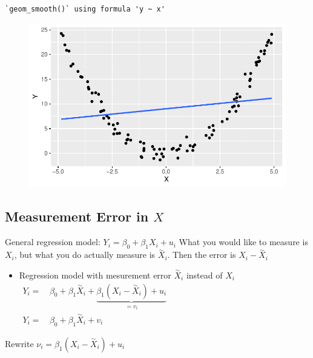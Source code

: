 \documentclass[
  letterpaper,
  DIV=11,
  numbers=noendperiod]{scrartcl}
\providecommand{\tightlist}{%
  \setlength{\itemsep}{0pt}\setlength{\parskip}{0pt}}\usepackage{longtable,booktabs,array}
\begin{document}
\begin{verbatim}
`geom_smooth()` using formula 'y ~ x'
\end{verbatim}

\begin{figure}[H]

{\centering \includegraphics{assesing_regression_files/figure-pdf/unnamed-chunk-4-1.pdf}

}

\end{figure}

\hypertarget{measurement-error-in-x}{%
\subsection{\texorpdfstring{Measurement Error in
\(X\)}{Measurement Error in X}}\label{measurement-error-in-x}}

General regression model: \(Y_i = \beta_0 + \beta_1X_{i} + u_{i}\) What
you would like to measure is \(X_i\), but what you do actually measure
is \(\overset{\sim}{X}_i\). Then the error is
\(X_i - \overset{\sim}{X}_i\)

\begin{itemize}
\tightlist
\item
  Regression model with mesurement error \(\overset{\sim}{X}_i\) instead
  of \(X_i\)
  \(\begin{align*} Y_i =& \, \beta_0 + \beta_1 \overset{\sim}{X}_i + \underbrace{\beta_1 (X_i - \overset{\sim}{X}_i) + u_i}_{=v_i} \\ Y_i =& \, \beta_0 + \beta_1 \overset{\sim}{X}_i + v_i \end{align*}\)
\end{itemize}

Rewrite \(ν_i = \beta_1 (X_i - \overset{\sim}{X}_i)+u_i\)
\end{document}
